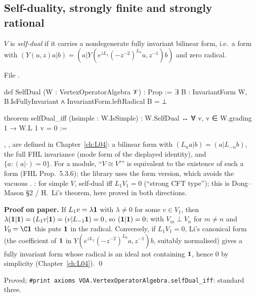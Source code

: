 \subsection{Self-duality, strongly finite and strongly rational}\label{l12:sec:strong}

\begin{definition}\label{l12:def:selfdual}
$V$ is \emph{self-dual} if it carries a nondegenerate fully invariant bilinear form, i.e.\ a form with
$(Y(u,z)a|b) = (a|Y(e^{zL_1}(-z^{-2})^{L_0}u,z^{-1})b)$ and zero radical.
\end{definition}
\noindent File .
\begin{leancode}
def SelfDual (W : VertexOperatorAlgebra 𝒱) : Prop :=
  ∃ B : InvariantForm W, B.IsFullyInvariant ∧ InvariantForm.leftRadical B = ⊥

theorem selfDual_iff (hsimple : W.IsSimple) :
    W.SelfDual ↔ ∀ v, v ∈ W.grading 1 → W.L 1 v = 0 :=
\end{leancode}

\begin{dictionary}
, ,  are defined in Chapter~\ref{ch:L04}: a bilinear form with
$(L_na|b) = (a|L_{-n}b)$, the full FHL invariance (mode form of the displayed identity), and $\{a : (a|\cdot) = 0\}$. For a
module, ``$V\cong V'$'' is equivalent to the existence of such a form (FHL Prop.~5.3.6); the library uses the form version,
which avoids the vacuous . : for simple $V$, self-dual iff $L_1V_1 = 0$
(``strong CFT type''); this is Dong--Mason §2 / H.~Li's theorem, here proved in both directions.
\end{dictionary}

\textbf{Proof on paper.} If $L_1v = \lambda\mathbf{1}$ with $\lambda\neq0$ for some $v\in V_1$, then
$\lambda(\mathbf{1}|\mathbf{1}) = (L_1v|\mathbf{1}) = (v|L_{-1}\mathbf{1}) = 0$, so $(\mathbf{1}|\mathbf{1}) = 0$; with $V_m\perp V_n$ for
$m\neq n$ and $V_0 = \C\ltwelvevac$ this puts $\mathbf{1}$ in the radical. Conversely, if $L_1V_1 = 0$, Li's canonical form (the coefficient of
$\mathbf{1}$ in $Y(e^{zL_1}(-z^{-2})^{L_0}a,z^{-1})b$, suitably normalised) gives a fully invariant form whose radical is an ideal not containing $\mathbf{1}$,
hence $0$ by simplicity (Chapter~\ref{ch:L04}). \qed

\begin{status}
Proved; \texttt{\#print axioms VOA.VertexOperatorAlgebra.selfDual\_iff}: standard three.
\end{status}

